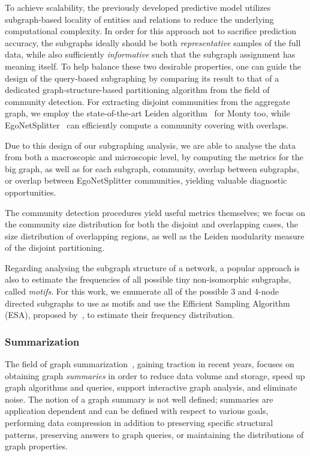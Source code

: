 To achieve scalability, the previously developed predictive model utilizes subgraph-based locality of entities and relations to reduce the underlying computational complexity. In order for this approach not to sacrifice prediction accuracy, the subgraphs ideally should be both \emph{representative} samples of the full data, while also sufficiently \emph{informative} such that the subgraph assignment has meaning itself. To help balance these two desirable properties, one can guide the design of the query-based subgraphing by comparing its result to that of a dedicated graph-structure-based partitioning algorithm from the field of community detection. For extracting disjoint communities from the aggregate graph, we employ the state-of-the-art Leiden algorithm~\cite{traag_louvain_2019} for Monty too, while EgoNetSplitter~\cite{epasto_ego-splitting_2017} can efficiently compute a community covering with overlaps.

Due to this design of our subgraphing analysis, we are able to analyse the data from both a macroscopic and microscopic level, by computing the metrics for the big graph, as well as for each subgraph, community, overlap between subgraphs, or overlap between EgoNetSplitter communities, yielding valuable diagnostic opportunities.

The community detection procedures yield useful metrics themselves; we focus on the community size distribution for both the disjoint and overlapping cases, the size distribution of overlapping regions, as well as the Leiden modularity measure of the disjoint partitioning.

Regarding analysing the subgraph structure of a network, a popular approach is also to estimate the frequencies of all possible tiny non-isomorphic subgraphs, called \emph{motifs}. For this work, we enumerate all of the possible 3 and 4-node directed subgraphs to use as motifs and use the Efficient Sampling Algorithm (ESA), proposed by~\cite{kashtan_efficient_2004}, to estimate their frequency distribution.  

\subsubsection{Summarization}

The field of graph summarization~\cite{liu_graph_2019}, gaining traction in recent years, focuses on obtaining graph \emph{summaries} in order to reduce data volume and storage, speed up graph algorithms and queries, support interactive graph analysis, and eliminate noise. The notion of a graph summary is not well defined; summaries are application dependent and can be defined with respect to various goals, performing data compression in addition to preserving specific structural patterns, preserving answers to graph queries, or maintaining the distributions of graph properties. 

